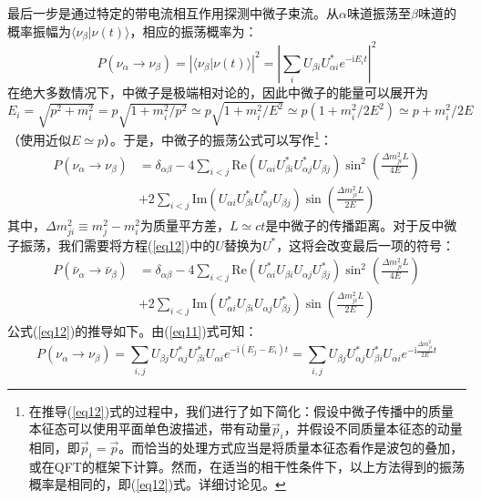 \documentclass{article}
\newcommand{\ii}{\mathrm{i}}
\begin{document}
	最后一步是通过特定的带电流相互作用探测中微子束流。从$\alpha$味道振荡至$\beta$味道的概率振幅为$\langle\nu_\beta|\nu(t)\rangle$，相应的振荡概率为：
	\begin{equation}
		P(\nu_\alpha\to\nu_\beta)=\left|\langle\nu_\beta|\nu(t)\rangle\right|^2=\left|\sum_i U_{\beta i}U_{\alpha i}^* e^{-\ii E_it}\right|^2
		\label{eq11}
	\end{equation}
	在绝大多数情况下，中微子是极端相对论的，因此中微子的能量可以展开为$E_i=\sqrt{p^2+m_i^2}=p\sqrt{1+m_i^2/p^2}\simeq p\sqrt{1+m_i^2/E^2}\simeq p(1+m_i^2/2E^2)\simeq p+m_i^2/2E$（使用近似$E\simeq p$）。于是，中微子的振荡公式可以写作\footnote{在推导(\ref{eq12})式的过程中，我们进行了如下简化：假设中微子传播中的质量本征态可以使用平面单色波描述，带有动量$\vec{p}_i$，并假设不同质量本征态的动量相同，即$\vec{p}_i=\vec{p}$。而恰当的处理方式应当是将质量本征态看作是波包的叠加，或在QFT的框架下计算。然而，在适当的相干性条件下，以上方法得到的振荡概率是相同的，即(\ref{eq12})式。详细讨论见\cite{akhmedov2009paradoxes}。}：
	\begin{equation}
		\begin{aligned}
			P(\nu_\alpha\to\nu_\beta)&=\delta_{\alpha\beta}-4\sum_{i<j}\mathrm{Re}(U_{\alpha i}U_{\beta i}^\ast U_{\alpha j}^\ast U_{\beta j})\sin^2\left(\frac{\Delta m_{ji}^2L}{4E}\right)\\&+2\sum_{i<j}\mathrm{Im}(U_{\alpha i}U_{\beta i}^\ast U_{\alpha j}^\ast U_{\beta j})\sin\left(\frac{\Delta m_{ji}^2L}{2E}\right)
		\end{aligned}
		\label{eq12}
	\end{equation}
	其中，$\Delta m_{ji}^2\equiv m_j^2-m_i^2$为质量平方差，$L\simeq ct$是中微子的传播距离。对于反中微子振荡，我们需要将方程(\ref{eq12})中的$U$替换为$U^*$，这将会改变最后一项的符号：
	\begin{equation*}
		\begin{aligned}
			P(\bar{\nu}_\alpha\to\bar{\nu}_\beta)&=\delta_{\alpha\beta}-4\sum_{i<j}\mathrm{Re}(U_{\alpha i}^*U_{\beta i} U_{\alpha j} U_{\beta j}^*)\sin^2\left(\frac{\Delta m_{ji}^2L}{4E}\right)\\&+2\sum_{i<j}\mathrm{Im}(U_{\alpha i}^*U_{\beta i} U_{\alpha j} U_{\beta j}^*)\sin\left(\frac{\Delta m_{ji}^2L}{2E}\right)
		\end{aligned}
	\end{equation*}
	公式(\ref{eq12})的推导如下。由(\ref{eq11})式可知：
	\begin{equation*}
		P(\nu_\alpha\to\nu_\beta)=\sum_{i,j}U_{\beta j}U_{\alpha j}^*U_{\beta i}^* U_{\alpha i}e^{-\ii (E_j-E_i)t}=\sum_{i,j}U_{\beta j}U_{\alpha j}^*U_{\beta i}^* U_{\alpha i}e^{-\ii \frac{\Delta m_{ji}^2}{2E} t}
	\end{equation*}
\end{document}
